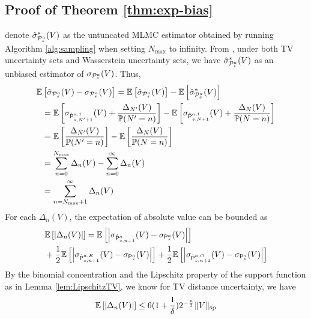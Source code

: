 \subsection{Proof of Theorem \ref{thm:exp-bias}} \label{proof:exp-bias}
    denote $\hat{\sigma}^{*}_{\mathcal{P}^a_s}(V)$ as the untuncated MLMC estimator obtained by running Algorithm \ref{alg:sampling} when setting $N_{\max}$ to infinity. From \citep{wang2023model}, under both TV uncertainty sets and Wasserstein uncertainty sets, we have $\hat{\sigma}^{*}_{\mathcal{P}^a_s}(V)$ as an unbiased estimator of ${\sigma}_{\mathcal{P}^a_s}(V)$. Thus,
    \begin{align}
        \mathbb{E}&\left[\hat{\sigma}_{\mathcal{P}^a_s}(V) - {\sigma}_{\mathcal{P}^a_s}(V)\right]   = \mathbb{E}\left[\hat{\sigma}_{\mathcal{P}^a_s}(V)\right] - \mathbb{E}\left[\hat{\sigma}^{*}_{\mathcal{P}^a_s}(V)\right] \nonumber\\
        &=\mathbb{E}\left[\sigma_{\hat{\mathsf P}^{a,1}_{s,N'+1}}(V)+\frac{\Delta_{N'}(V)}{  \mathbb{P}(N' = n) }\right] - \mathbb{E}\left[\sigma_{\hat{\mathsf P}^{a,1}_{s,N+1}}(V)+\frac{\Delta_{N}(V)}{  \mathbb{P}(N = n) }\right]  \nonumber\\
        &=\mathbb{E}\left[\frac{\Delta_{N'}(V)}{  \mathbb{P}(N' = n) }\right] - \mathbb{E}\left[\frac{\Delta_{N}(V)}{  \mathbb{P}(N = n) }\right]  \nonumber\\
        &=\sum_{n=0}^{N_{\max}}\Delta_{n}(V) - \sum_{n=0}^{\infty}\Delta_{n}(V)   \nonumber\\
        &= \sum_{n=N_{\max}+1}^{\infty}\Delta_{n}(V)
    \end{align}
    For each $\Delta_n(V)$, the expectation of absolute value can be bounded as
    \begin{align}
        &\mathbb{E}\left[\left | \Delta_n(V) \right |\right] =\mathbb{E}\left[\left | \sigma_{\hat{\mathsf P}^{a}_{s,n+1}}(V)-\sigma_{{\mathsf P}^{a}_{s}}(V) \right |\right]\nonumber\\
        &+\frac{1}{2}\mathbb{E}\left[\left | \sigma_{\hat{\mathsf P}^{a,E}_{s,n+1}}(V)-\sigma_{{\mathsf P}^{a}_{s}}(V) \right |\right]+\frac{1}{2}\mathbb{E}\left[\left | \sigma_{\hat{\mathsf P}^{a,O}_{s,n+1}}(V)-\sigma_{{\mathsf P}^{a}_{s}}(V) \right |\right]
    \end{align}
    By the binomial concentration and the Lipschitz property of the support function as in Lemma \ref{lem:LipschitzTV}, we know for TV distance uncertainty, we have
    \begin{equation}  \label{eq:DeltaabsboundTV}
    \mathbb{E}\left[\left | \Delta_n(V) \right |\right] \leq 6(1+\frac{1}{\delta}) 2^{-\frac{n}{2}}\|V\|_{\mathrm{sp}}
    \end{equation}  
